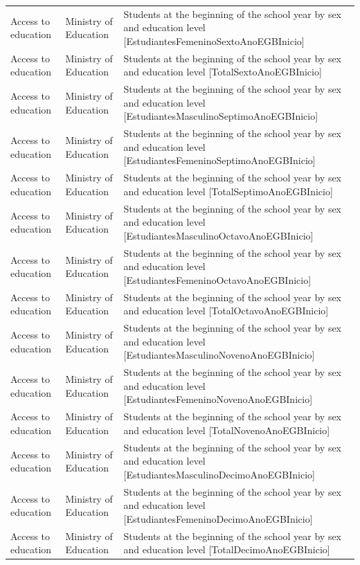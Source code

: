 \documentclass[10pt,a4paper]{article}
\begin{document}
\begin{longtable}{@{}>{\raggedright\arraybackslash}p{3.5cm}>{\raggedright\arraybackslash}p{5.6cm}>{\raggedright\arraybackslash}p{\dimexpr\textwidth-9.1cm-4\tabcolsep\relax}@{}}
Access to education & Ministry of Education & Students at the beginning of the school year by sex and education level [EstudiantesFemeninoSextoAnoEGBInicio]\\
Access to education & Ministry of Education & Students at the beginning of the school year by sex and education level [TotalSextoAnoEGBInicio]\\
Access to education & Ministry of Education & Students at the beginning of the school year by sex and education level [EstudiantesMasculinoSeptimoAnoEGBInicio]\\
Access to education & Ministry of Education & Students at the beginning of the school year by sex and education level [EstudiantesFemeninoSeptimoAnoEGBInicio]\\
Access to education & Ministry of Education & Students at the beginning of the school year by sex and education level [TotalSeptimoAnoEGBInicio]\\
Access to education & Ministry of Education & Students at the beginning of the school year by sex and education level [EstudiantesMasculinoOctavoAnoEGBInicio]\\
Access to education & Ministry of Education & Students at the beginning of the school year by sex and education level [EstudiantesFemeninoOctavoAnoEGBInicio]\\
Access to education & Ministry of Education & Students at the beginning of the school year by sex and education level [TotalOctavoAnoEGBInicio]\\
Access to education & Ministry of Education & Students at the beginning of the school year by sex and education level [EstudiantesMasculinoNovenoAnoEGBInicio]\\
Access to education & Ministry of Education & Students at the beginning of the school year by sex and education level [EstudiantesFemeninoNovenoAnoEGBInicio]\\
Access to education & Ministry of Education & Students at the beginning of the school year by sex and education level [TotalNovenoAnoEGBInicio]\\
Access to education & Ministry of Education & Students at the beginning of the school year by sex and education level [EstudiantesMasculinoDecimoAnoEGBInicio]\\
Access to education & Ministry of Education & Students at the beginning of the school year by sex and education level [EstudiantesFemeninoDecimoAnoEGBInicio]\\
Access to education & Ministry of Education & Students at the beginning of the school year by sex and education level [TotalDecimoAnoEGBInicio]\\

\end{longtable}
\end{document}
